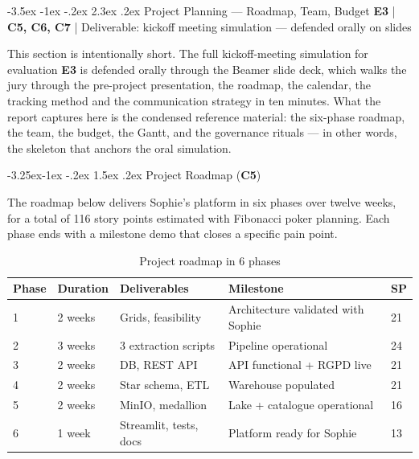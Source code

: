 \documentclass[a4paper,11pt,oneside,openany]{report}
\makeatletter
\renewcommand\section{\@startsection{section}{1}{\z@}%
  {-3.5ex \@plus -1ex \@minus -.2ex}%
  {2.3ex \@plus.2ex}%
  {\normalfont\Large\bfseries\color{ntgreen}}}
\renewcommand\subsection{\@startsection{subsection}{2}{\z@}%
  {-3.25ex\@plus -1ex \@minus -.2ex}%
  {1.5ex \@plus .2ex}%
  {\normalfont\large\bfseries\color{ntdarkgreen}}}
\newcommand{\competence}[1]{\textbf{\textcolor{ntgreen}{#1}}}
\newcommand{\evaluation}[1]{\textbf{\textcolor{ntblue}{#1}}}
\makeatother
\begin{document}
\section{Project Planning --- Roadmap, Team, Budget}
\label{sec:e3}
{\small\evaluation{E3} | \competence{C5, C6, C7} |
Deliverable: kickoff meeting simulation --- defended orally on
slides}

This section is intentionally short. The full kickoff-meeting
simulation for evaluation \evaluation{E3} is defended orally
through the Beamer slide deck, which walks the jury through the
pre-project presentation, the roadmap, the calendar, the tracking
method and the communication strategy in ten minutes. What the
report captures here is the condensed reference material: the
six-phase roadmap, the team, the budget, the Gantt, and the
governance rituals --- in other words, the skeleton that anchors
the oral simulation.

\subsection{Project Roadmap (\competence{C5})}

The roadmap below delivers Sophie's platform in six phases over
twelve weeks, for a total of 116 story points estimated with
Fibonacci poker planning. Each phase ends with a milestone demo
that closes a specific pain point.

\begin{table}[H]
\centering
\caption{Project roadmap in 6 phases}
\label{tab:roadmap}
\begin{tabularx}{\textwidth}{L{1cm} L{2cm} L{3cm} L{5cm} C{1.5cm}}
\toprule
\textbf{Phase} & \textbf{Duration} & \textbf{Deliverables} & \textbf{Milestone} & \textbf{SP} \\
 & 2 weeks & Grids, feasibility & Architecture validated with Sophie & 21 \\
2 & 3 weeks & 3 extraction scripts & Pipeline operational & 24 \\
3 & 2 weeks & DB, REST API & API functional + RGPD live & 21 \\
4 & 2 weeks & Star schema, ETL & Warehouse populated & 21 \\
5 & 2 weeks & MinIO, medallion & Lake + catalogue operational & 16 \\
6 & 1 week & Streamlit, tests, docs & Platform ready for Sophie & 13 \\
\bottomrule
\end{tabularx}
\end{table}
\end{document}
